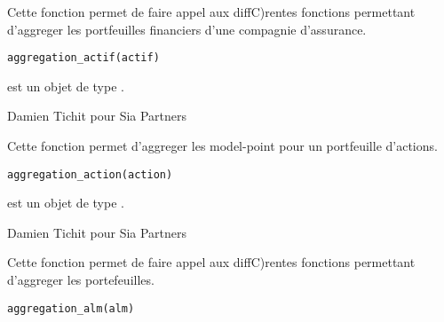 \documentclass[a4paper]{book}
\begin{document}
%
\begin{Description}\relax
Cette fonction permet de faire appel aux diffC)rentes fonctions permettant d'aggreger les portfeuilles financiers
d'une compagnie d'assurance.
\end{Description}
%
\begin{Usage}
\begin{verbatim}
aggregation_actif(actif)
\end{verbatim}
\end{Usage}
%
\begin{Arguments}
\begin{ldescription}
\item[\code{actif}] est un objet de type .
\end{ldescription}
\end{Arguments}
%
\begin{Author}\relax
Damien Tichit pour Sia Partners
\end{Author}
%
\begin{Description}\relax
Cette fonction permet d'aggreger les model-point pour un portfeuille d'actions.
\end{Description}
%
\begin{Usage}
\begin{verbatim}
aggregation_action(action)
\end{verbatim}
\end{Usage}
%
\begin{Arguments}
\begin{ldescription}
\item[\code{action}] est un objet de type .
\end{ldescription}
\end{Arguments}
%
\begin{Author}\relax
Damien Tichit pour Sia Partners
\end{Author}
%
\begin{Description}\relax
Cette fonction permet de faire appel aux diffC)rentes fonctions permettant d'aggreger les portefeuilles.
\end{Description}
%
\begin{Usage}
\begin{verbatim}
aggregation_alm(alm)
\end{verbatim}
\end{Usage}
\end{document}
